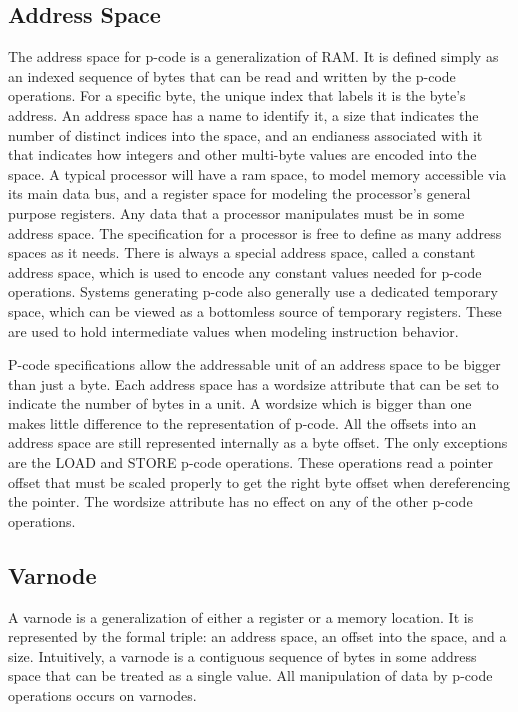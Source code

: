 \subsection{Address Space}
The address space for p-code is a generalization of RAM. It is defined simply as an indexed sequence of bytes that can be read and written by the p-code operations. For a specific byte, the unique index that labels it is the byte's address. An address space has a name to identify it, a size that indicates the number of distinct indices into the space, and an endianess associated with it that indicates how integers and other multi-byte values are encoded into the space. A typical processor will have a ram space, to model memory accessible via its main data bus, and a register space for modeling the processor's general purpose registers. Any data that a processor manipulates must be in some address space. The specification for a processor is free to define as many address spaces as it needs. There is always a special address space, called a constant address space, which is used to encode any constant values needed for p-code operations. Systems generating p-code also generally use a dedicated temporary space, which can be viewed as a bottomless source of temporary registers. These are used to hold intermediate values when modeling instruction behavior.

P-code specifications allow the addressable unit of an address space to be bigger than just a byte. Each address space has a wordsize attribute that can be set to indicate the number of bytes in a unit. A wordsize which is bigger than one makes little difference to the representation of p-code. All the offsets into an address space are still represented internally as a byte offset. The only exceptions are the LOAD and STORE p-code operations. These operations read a pointer offset that must be scaled properly to get the right byte offset when dereferencing the pointer. The wordsize attribute has no effect on any of the other p-code operations. 

\subsection{Varnode}
A varnode is a generalization of either a register or a memory location. It is represented by the formal triple: an address space, an offset into the space, and a size. Intuitively, a varnode is a contiguous sequence of bytes in some address space that can be treated as a single value. All manipulation of data by p-code operations occurs on varnodes.

